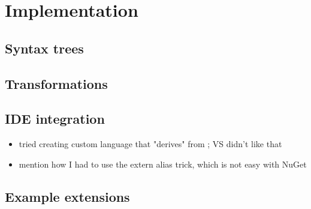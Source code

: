 \chapter{Implementation}

\section{Syntax trees}

\section{Transformations}

\section{IDE integration}

\begin{itemize}
\item tried creating custom language that "derives" from ; VS didn't like that
\item mention how I had to use the extern alias trick, which is not easy with NuGet
\end{itemize}

\section{Example extensions}